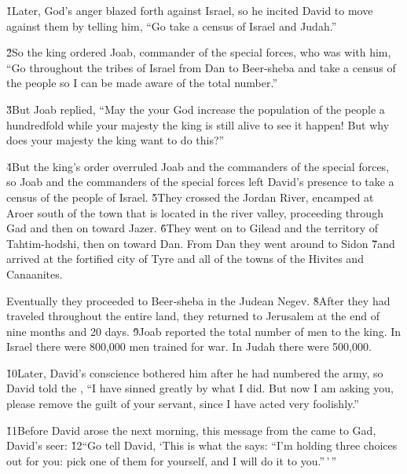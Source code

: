 \v{1}Later, God's anger blazed forth against Israel, so he incited David to move against them by telling him, ``Go take a census of Israel and Judah.''

\v{2}So the king ordered Joab, commander of the special forces, who was with him, ``Go throughout the tribes of Israel from Dan to Beer-sheba and take a census of the people so I can be made aware of the total number.''

\v{3}But Joab replied, ``May the  your God increase the population of the people a hundredfold while your majesty the king is still alive to see it happen! But why does your majesty the king want to do this?''

\v{4}But the king's order overruled Joab and the commanders of the special forces, so Joab and the commanders of the special forces left David's presence to take a census of the people of Israel. \v{5}They crossed the Jordan River, encamped at Aroer south of the town that is located in the river valley, proceeding through Gad and then on toward Jazer. \v{6}They went on to Gilead and the territory of Tahtim-hodshi, then on toward Dan. From Dan they went around to Sidon \v{7}and arrived at the fortified city of Tyre and all of the towns of the Hivites and Canaanites.

Eventually they proceeded to Beer-sheba in the Judean Negev. \v{8}After they had traveled throughout the entire land, they returned to Jerusalem at the end of nine months and 20 days. \v{9}Joab reported the total number of men to the king. In Israel there were 800,000 men trained for war. In Judah there were 500,000.

\v{10}Later, David's conscience bothered him after he had numbered the army, so David told the , ``I have sinned greatly by what I did. But now I am asking you, please remove the guilt of your servant, since I have acted very foolishly.''

\v{11}Before David arose the next morning, this message from the  came to Gad, David's seer: \v{12}``Go tell David, `This is what the  says: ``I'm holding three choices out for you: pick one of them for yourself, and I will do it to you.''\,'\,''


